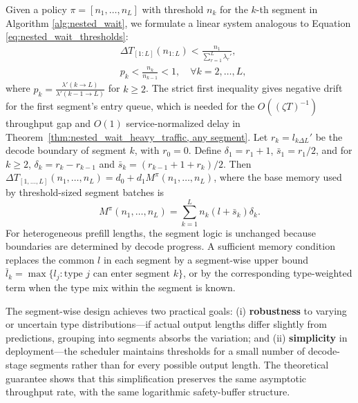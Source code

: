 Given a policy $\pi=[n_1,\dots,n_L]$ with threshold $n_k$ for the $k$-th segment in Algorithm \ref{alg:nested_wait}, we formulate a linear system analogous to Equation \eqref{eq:nested_wait_thresholds}:
\begin{equation}          \label{eq:nested_wait_thresholds_L}
    \begin{aligned}
    &\Delta T_{[1:L]}(n_{1:L}) < \frac{n_1}{\sum_{r=1}^L \lambda_r'},  \\
    &p_k < \frac{n_k}{n_{k-1}} < 1,\quad \forall k=2,\dots,L,
    \end{aligned}
\end{equation}
where $p_k =\frac{\lambda'(k \to L)}{\lambda'(k-1 \to L)}$ for \(k\ge2\). The strict first inequality gives negative drift for the first segment's entry queue, which is needed for the \(O((\zeta T)^{-1})\) throughput gap and \(O(1)\) service-normalized delay in Theorem~\ref{thm:nested_wait_heavy_traffic, any segment}. Let \(r_k=l_{k\Delta L}'\) be the decode boundary of segment \(k\), with \(r_0=0\). Define \(\delta_1=r_1+1\), \(\bar s_1=r_1/2\), and for \(k\ge2\), \(\delta_k=r_k-r_{k-1}\) and \(\bar s_k=(r_{k-1}+1+r_k)/2\). Then \(\Delta T_{[1,\dots,L]}(n_1,\dots,n_L)=d_0+d_1M^\pi(n_1,\dots,n_L)\), where the base memory used by threshold-sized segment batches is
\[
M^{\pi}(n_1, \dots, n_L) = \sum_{k=1}^L n_k (l+\bar s_k)\delta_k.
\]
For heterogeneous prefill lengths, the segment logic is unchanged because boundaries are determined by decode progress. A sufficient memory condition replaces the common \(l\) in each segment by a segment-wise upper bound \(\bar l_k=\max\{l_j: \text{type }j\text{ can enter segment }k\}\), or by the corresponding type-weighted term when the type mix within the segment is known.

The segment-wise design achieves two practical goals: (i) \textbf{robustness} to varying or uncertain type distributions---if actual output lengths differ slightly from predictions, grouping into segments absorbs the variation; and (ii) \textbf{simplicity} in deployment---the scheduler maintains thresholds for a small number of decode-stage segments rather than for every possible output length. The theoretical guarantee shows that this simplification preserves the same asymptotic throughput rate, with the same logarithmic safety-buffer structure.


